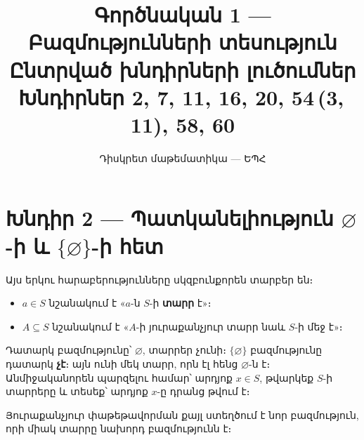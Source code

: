 \documentclass[12pt, a4paper]{article}
\title{\textbf{Գործնական 1 — Բազմությունների տեսություն}\\[4pt]
       \large Ընտրված խնդիրների լուծումներ\\[2pt]
       \normalsize Խնդիրներ 2, 7, 11, 16, 20, 54\,(3,\,11), 58, 60}
\author{Դիսկրետ մաթեմատիկա — ԵՊՀ}
\date{}
\begin{document}
\maketitle
\tableofcontents
\newpage

\section{Խնդիր 2 — Պատկանելիություն $\varnothing$-ի և $\{\varnothing\}$-ի հետ}

\begin{theorybox}
Այս երկու հարաբերությունները սկզբունքորեն տարբեր են։
\begin{itemize}[nosep]
  \item $a \in S$ նշանակում է «$a$-ն $S$-ի \textbf{տարր} է»։
  \item $A \subseteq S$ նշանակում է «$A$-ի յուրաքանչյուր տարր նաև $S$-ի մեջ է»։
\end{itemize}

\medskip
Դատարկ բազմությունը՝ $\varnothing$, տարրեր չունի։
$\{\varnothing\}$ բազմությունը դատարկ \textbf{չէ}։ այն ունի մեկ տարր, որն էլ հենց $\varnothing$-ն է։
Անմիջականորեն պարզելու համար՝ արդյոք $x \in S$, թվարկեք $S$-ի տարրերը և տեսեք՝ արդյոք $x$-ը դրանց թվում է։

\begin{center}
\end{center}
Յուրաքանչյուր փաթեթավորման քայլ ստեղծում է նոր բազմություն, որի միակ տարրը նախորդ բազմությունն է։
\end{theorybox}
\end{document}
